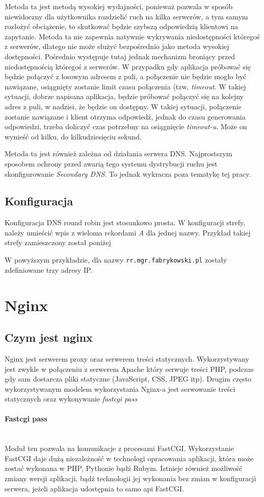 {Metoda ta jest metodą wysokiej wydajności, ponieważ pozwala w sposób niewidoczny dla użytkownika rozdzielić ruch na kilka serwerów, a tym samym rozłożyć obciążenie, to skutkować będzie szybszą odpowiedzią klientowi na zapytanie.
Metoda ta nie zapewnia natywnie wykrywania niedostępności któregoś z serwerów, dlatego nie może służyć bezpośrednio jako metoda wysokiej dostępności.
Pośrednio występuje tutaj jednak mechanizm broniący przed niedostępnością któregoś z serwerów. W przypadku gdy aplikacja próbować się będzie połączyć z losowym adresem z puli, a połączenie nie będzie mogło być nawiązane, osiągnięty zostanie limit czasu połączenia (tzw. \textit{timeout}. W takiej sytuacji, dobrze napisana aplikacja, będzie próbować połączyć się na kolejny adres z puli, w nadziei, że będzie on dostępny.
W takiej sytuacji, połączenie zostanie nawiązane i klient otrzyma odpowiedź, jednak do czasu generowania odpowiedzi, trzeba doliczyć czas potrzebny na osiągnięcie \textit{timeout-u}. Może on wynieść od kilku, do kilkudziesięciu sekund.

Metoda ta jest również zależna od działania serwera DNS.
Najprostszym sposobem ochrony przed awarią tego systemu dystrybucji ruchu jest skonfigurowanie \textit{Secondary DNS}. To jednak wykracza poza tematykę tej pracy.
\subsection{Konfiguracja}
Konfiguracja DNS round robin jest stosunkowo prosta.
W konfiguracji strefy, należy umieścić wpis z wieloma rekordami \textit{A} dla jednej nazwy.
Przykład takiej strefy zamieszczony został poniżej

W powyższym przykładzie, dla nazwy \texttt{rr.mgr.fabrykowski.pl} zostały zdefiniowane trzy adresy IP.
\section{Nginx}
\subsection{Czym jest nginx}
Nginx jest serwerem proxy oraz serwerem treści statycznych.
Wykorzystywany jest zwykle w połączeniu z serwerem Apache który serwuje treści PHP, podczas gdy sam dostarcza pliki statyczne (JavaScript, CSS, JPEG itp).
Drugim często wykorzystywanym modelem wykorzystania Nginx-a jest serwowanie treści statycznych oraz wykonywanie \textit{fastcgi pass}
\paragraph*{Fastcgi pass} \hspace{0pt} \\
Moduł ten pozwala na komunikacje z procesami FastCGI.
Wykorzystanie FastCGI daje dużą niezależność w technologi opracowania aplikacji, która może zostać wykonana w PHP, Pythonie bądź Rubym.
Istnieje również możliwość zmiany wersji aplikacji, bądź technologii jej wykonania bez zmian w konfiguracji serwera, jeżeli aplikacja udostępnia to samo api FastCGI.

}
